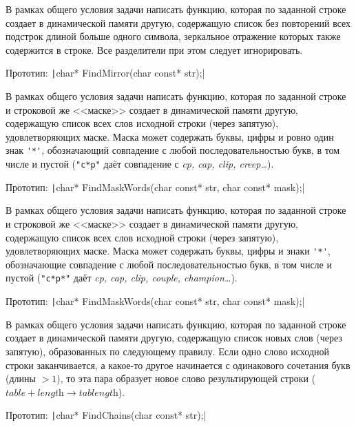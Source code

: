 \begin{zztask}
В рамках общего условия задачи написать функцию, которая по заданной строке
создает в динамической памяти другую, содержащую список без повторений всех
подстрок длиной больше одного символа, зеркальное отражение которых также
содержится в строке. Все разделители при этом следует игнорировать.

Прототип: \texttt|char* FindMirror(char const* str);|
\end{zztask}

\begin{zztask}
В рамках общего условия задачи написать функцию, которая по заданной строке
и строковой же <<маске>> создает в динамической памяти другую, содержащую список
всех слов исходной строки (через запятую), удовлетворяющих маске. Маска может
содержать буквы, цифры и ровно один знак \verb|'*'|, обозначающий совпадение с любой
последовательностью букв, в том числе и пустой (\verb|"c*p"| даёт совпадение с
\textit{cp, cap, clip, creep\dots}).

Прототип: \texttt|char* FindMaskWords(char const* str, char const* mask);|
\end{zztask}

\begin{zztask}
В рамках общего условия задачи написать функцию, которая по заданной строке
и строковой же <<маске>> создает в динамической памяти другую, содержащую список
всех слов исходной строки (через запятую), удовлетворяющих маске. Маска может
содержать буквы, цифры и знаки \verb|'*'|, обозначающие совпадение с любой
последовательностью букв, в том числе и пустой (\verb|"c*p*"| даёт
\textit{cp, cap, clip, couple, champion\dots}).

Прототип: \texttt|char* FindMaskWords(char const* str, char const* mask);|
\end{zztask}

\begin{zztask}
В рамках общего условия задачи написать функцию, которая по заданной строке
создает в динамической памяти другую, содержащую список новых слов (через
запятую), образованных по следующему правилу. Если одно слово исходной строки
заканчивается, а какое-то другое начинается с одинакового сочетания букв
(длины $> 1$), то эта пара образует новое слово результирующей строки
($\textit{table} + \textit{length} \rightarrow \textit{tablength}$).

Прототип: \texttt|char* FindChains(char const* str);|
\end{zztask}

